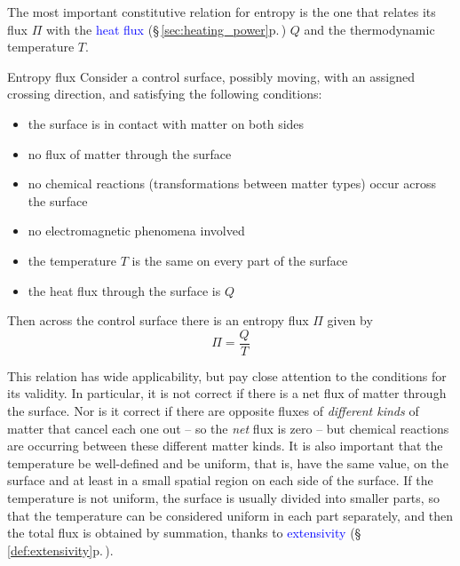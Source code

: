 \documentclass[a4paper,12pt,%
onecolumn,oneside,%
british%
]{memoir}
\renewcommand*{\|}[1][]{\nonscript\:#1\vert\nonscript\:\mathopen{}}
\newcommand*{\sect}{\S}%
\renewcommand*{\autoref}[3][\sect\,\ref]{\textcolor{blue}{#3} {\color{blue}\scriptsize(\faIcon[regular]{eye}\;#1{#2}\;p.\,\pageref{#2})}}
\newcommand*{\yQ}{Q}%
\newcommand*{\yB}{\varPi}
\newcommand*{\yT}{T}%
\begin{document}
The most important constitutive relation for entropy is the one that relates its flux $\yB$ with the \autoref{sec:heating_power}{heat flux} $\yQ$ and the thermodynamic temperature $\yT$.
\begin{definition}{Entropy flux}\label{def:entropyflux}
  Consider a control surface, possibly moving, with an assigned crossing direction, and satisfying the following conditions:
  \begin{itemize}[nosep]
  \item the surface is in contact with matter on both sides
  \item no flux of matter through the surface
  \item no chemical reactions (transformations between matter types) occur across the surface
  \item no electromagnetic phenomena involved
  \item the temperature $\yT$ is the same on every part of the surface
  \item the heat flux through the surface is $\yQ$
  \end{itemize}

\medskip

  Then across the control surface there is an entropy flux $\yB$ given by
  \begin{equation}
    \label{eq:entropy_flux}
    \yB = \frac{\yQ}{\yT}
  \end{equation}
\end{definition}
This relation has wide applicability, but pay close attention to the conditions for its validity. In particular, it is not correct if there is a net flux of matter through the surface. Nor is it correct if there are opposite fluxes of \emph{different kinds} of matter that cancel each one out -- so the \emph{net} flux is zero -- but chemical reactions are occurring between these different matter kinds. It is also important that the temperature be well-defined and be uniform, that is, have the same value, on the surface and at least in a small spatial region on each side of the surface. If the temperature is not uniform, the surface is usually divided into smaller parts, so that the temperature can be considered uniform in each part separately, and then the total flux is obtained by summation, thanks to \autoref{def:extensivity}{extensivity}.
\end{document}
